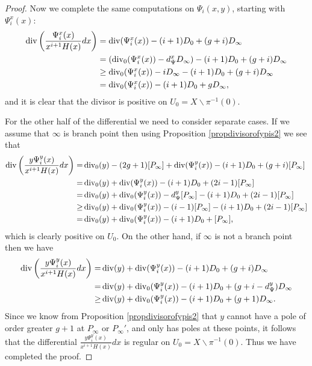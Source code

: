 \begin{proof}
    Now we complete the same computations on $\Psi_i(x,y)$, starting with $\Psi_i^x(x)$:
        \begin{align*}
        \operatorname{div}\left( \frac{\Psi_i^x(x) }{x^{i+1}H(x)}dx \right)  & =   \operatorname{div}(\Psi_i^x(x))  - (i+1)D_0 + (g+i)D_\infty \\
        & = (\operatorname{div}_0(\Psi_i^x(x)) -d_\Psi^xD_\infty) - (i+1)D_0 + (g+i)D_\infty \\
         & \geq   \operatorname{div}_0(\Psi_i^x(x) ) - iD_\infty - (i+1)D_0 + (g+i)D_\infty \\
         & =   \operatorname{div}_0(\Psi_i^x(x)) - (i+1)D_0 + gD_\infty,
        \end{align*}
    and it is clear that the divisor is positive on $U_0 = X \backslash \pi^{-1}(0)$.
    
    For the other half of the differential we need to consider separate cases.
    If we assume that $\infty$ is branch point then  using Proposition \ref{propdivisorofypis2} we see that
        \begin{align*}
        \operatorname{div}\left(\frac{y\Psi_i^y(x) }{x^{i+1}H(x)}dx \right)  =  & \operatorname{div}_0(y) - (2g+1)[P_\infty] + \operatorname{div}(\Psi_i^y(x)) - (i+1)D_0 + (g+i)[P_\infty] \\
         =  & \operatorname{div}_0(y) + \operatorname{div}(\Psi_i^y(x)) -(i+1)D_0 + (2i -1)[P_\infty] \\
         = &  \operatorname{div}_0(y) + \operatorname{div}_0(\Psi_i^y(x)) - d_\Psi^y[P_\infty] - (i+1)D_0 + (2i-1)[P_\infty] \\
         \geq &  \operatorname{div}_0(y) + \operatorname{div}_0(\Psi_i^y(x)) -(i-1)[P_\infty] -(i+1)D_0 + (2i-1)[P_\infty] \\
         =   &\operatorname{div}_0(y) + \operatorname{div}_0(\Psi_i^y(x)) -(i+1)D_0 + [P_\infty],
        \end{align*}
    which is clearly positive on $U_0$.
    On the other hand, if $\infty$ is not a branch point then we have
        \begin{align*}
        \operatorname{div}\left(\frac{y\Psi_i^y(x) }{x^{i+1}H(x)}dx \right)  =  & \operatorname{div}(y) + \operatorname{div}(\Psi_i^y(x)) - (i+1)D_0 + (g+i)D_\infty \\
        = & \operatorname{div}(y) + \operatorname{div}_0(\Psi_i^y(x)) - (i+1)D_0 + (g+i - d_\Psi^y)D_\infty \\
        \geq & \operatorname{div}(y) + \operatorname{div}_0(\Psi_i^y(x)) - (i+1)D_0 + (g+1)D_\infty. \\
        \end{align*}
    Since we know from Proposition \ref{propdivisorofypis2} that $y$ cannot have a pole of order greater $g+1$ at $P_\infty$ or $P_\infty'$, and only has poles at these points, it follows that the differential $\frac{y\Psi_i^y(x) }{x^{i+1}H(x)}dx$ is regular on $U_0 = X \backslash \pi^{-1}(0)$.
    Thus we have completed the proof.
    
    
    \end{proof}


